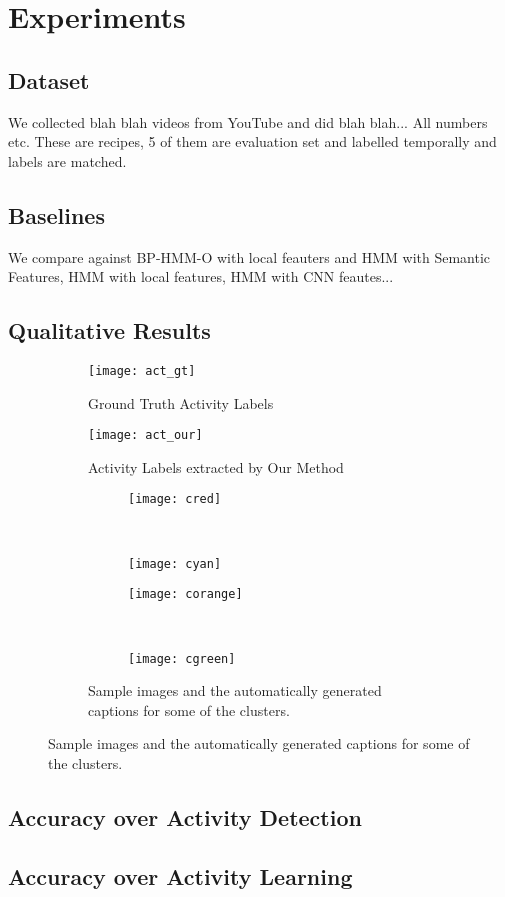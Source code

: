 \section{Experiments}
\subsection{Dataset}
We collected blah blah videos from YouTube and did blah blah... All numbers etc. These are recipes, 5 of them are evaluation set and labelled temporally and labels are matched.
\subsection{Baselines}
We compare against BP-HMM-O with local feauters and HMM with Semantic Features, HMM with local features, HMM with CNN feautes...
\subsection{Qualitative Results}
\begin{figure}
  \begin{subfigure}[b]{0.5\textwidth}
  \texttt{[image: act\_gt]}
  \caption{Ground Truth Activity Labels}
  \end{subfigure}
  \begin{subfigure}[b]{0.5\textwidth}
  \texttt{[image: act\_our]}
  \caption{Activity Labels extracted by Our Method}
  \end{subfigure}

\begin{subfigure}[b]{0.5\textwidth}
\begin{subfigure}[b]{0.5\textwidth}
\texttt{[image: cred]}
\color[HTML]{FF3800}{Crack the eggs one at a time into a bowl.}
\end{subfigure}~
\begin{subfigure}[b]{0.5\textwidth}
\texttt{[image: cyan]}
\color[HTML]{00FFED}{Remove the omelette onto a plate.}
\end{subfigure}


\begin{subfigure}[b]{0.5\textwidth}
\texttt{[image: corange]}
\color[HTML]{FF9900}{You can either use a fork or wire whisk to beat the eggs into a bowl.}
\end{subfigure}~
\begin{subfigure}[b]{0.5\textwidth}
\texttt{[image: cgreen]}
\color[HTML]{9DFF00}{Eggs cook quickly, so make sure the pan gets very hot first; the butter melt completely.}
\end{subfigure}



\caption{Sample images and the automatically generated captions for some of the clusters.}
\end{subfigure}

\end{figure}
\subsection{Accuracy over Activity Detection}
\subsection{Accuracy over Activity Learning}
